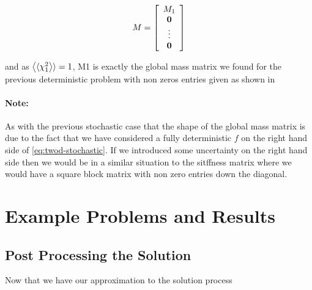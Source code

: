 \begin{equation}
    M = \left[\begin{array}{c}
            M_1 \\ \mathbf{0} \\ \vdots \\ \mathbf{0}
    \end{array}\right]
\end{equation}

and as $\left\langle\langle\chi_1^2\right\rangle\rangle = 1$, M1 is exactly the global mass matrix we found
for the previous deterministic problem with non zeros entries given as shown in


\paragraph{Note:}

As with the previous stochastic case that the shape of the global mass matrix
is due to the fact that we have considered a fully deterministic $f$ on the
right hand side of \ref{eq:twod-stochastic}. If we introduced some uncertainty
on the right hand side then we would be in a similar situation to the sitffness
matrix where we would have a square block matrix with non zero entries down the
diagonal.

\section{Example Problems and Results}

\subsection{Post Processing the Solution}

Now that we have our approximation to the solution process
